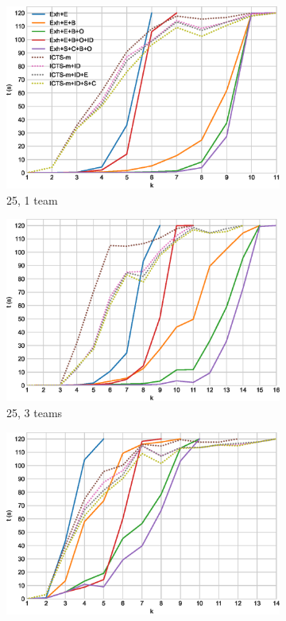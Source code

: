 \documentclass[english,10pt]{article}
\begin{document}
	\begin{figure}[b]
	\centering
	\begin{subfigure}{0.44\textwidth}
		\centering
		\includegraphics[width=\linewidth]{img/results/relative-comparison/25-1}
		\caption{25, 1 team}
		\label{fig:25-1}
	\end{subfigure}
	\begin{subfigure}{0.44\textwidth}
		\centering
		\includegraphics[width=\linewidth]{img/results/relative-comparison/25-3}
		\caption{25, 3 teams}
		\label{fig:25-3}
	\end{subfigure}
	\begin{subfigure}{0.44\textwidth}
		\centering
		\includegraphics[width=\linewidth]{img/results/relative-comparison/75-1}

\end{subfigure}
\end{figure}
\end{document}
